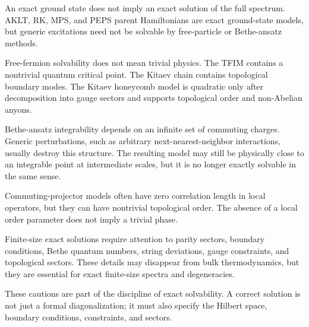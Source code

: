 \begin{remark}
An exact ground state does not imply an exact solution of the full spectrum.  AKLT, RK, MPS, and PEPS parent Hamiltonians are exact ground-state models, but generic excitations need not be solvable by free-particle or Bethe-ansatz methods.
\end{remark}

\begin{remark}
Free-fermion solvability does not mean trivial physics.  The TFIM contains a nontrivial quantum critical point.  The Kitaev chain contains topological boundary modes.  The Kitaev honeycomb model is quadratic only after decomposition into gauge sectors and supports topological order and non-Abelian anyons.
\end{remark}

\begin{remark}
Bethe-ansatz integrability depends on an infinite set of commuting charges.  Generic perturbations, such as arbitrary next-nearest-neighbor interactions, usually destroy this structure.  The resulting model may still be physically close to an integrable point at intermediate scales, but it is no longer exactly solvable in the same sense.
\end{remark}

\begin{remark}
Commuting-projector models often have zero correlation length in local operators, but they can have nontrivial topological order.  The absence of a local order parameter does not imply a trivial phase.
\end{remark}

\begin{remark}
Finite-size exact solutions require attention to parity sectors, boundary conditions, Bethe quantum numbers, string deviations, gauge constraints, and topological sectors.  These details may disappear from bulk thermodynamics, but they are essential for exact finite-size spectra and degeneracies.
\end{remark}

These cautions are part of the discipline of exact solvability.  A correct solution is not just a formal diagonalization; it must also specify the Hilbert space, boundary conditions, constraints, and sectors.

